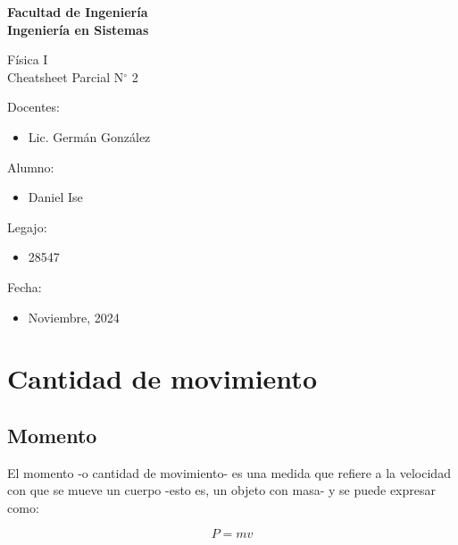 \documentclass[12pt]{article}
\begin{document}
\thispagestyle{empty}

\begin{center}
	\vspace*{.5cm}
	\vspace{.2cm}
	\Large
	\textbf{Facultad de Ingeniería}\\
	\textbf{Ingeniería en Sistemas}\\
	\vspace{2cm}

	\Huge
	Física I\\
	Cheatsheet Parcial N\(^\circ\) 2\\
	\vfill

	\raggedright
	\Large
	Docentes:
	\begin{itemize}
		\item[] Lic. Germán González \\
	\end{itemize}
	Alumno:
	\begin{itemize}
		\item[] Daniel Ise
	\end{itemize}
	Legajo:
	\begin{itemize}
		\item[] 28547
	\end{itemize}
	Fecha:
	\begin{itemize}
		\item[] Noviembre, 2024
	\end{itemize}
\end{center}

\pagebreak

\tableofcontents



\pagebreak

\section{Cantidad de movimiento}

\subsection{Momento}

El momento -o cantidad de movimiento-
es una medida que refiere a la velocidad con que se mueve un cuerpo
-esto es,
un objeto con masa-
y se puede expresar como:

\begin{equation}
	P = mv
\end{equation}
\end{document}
